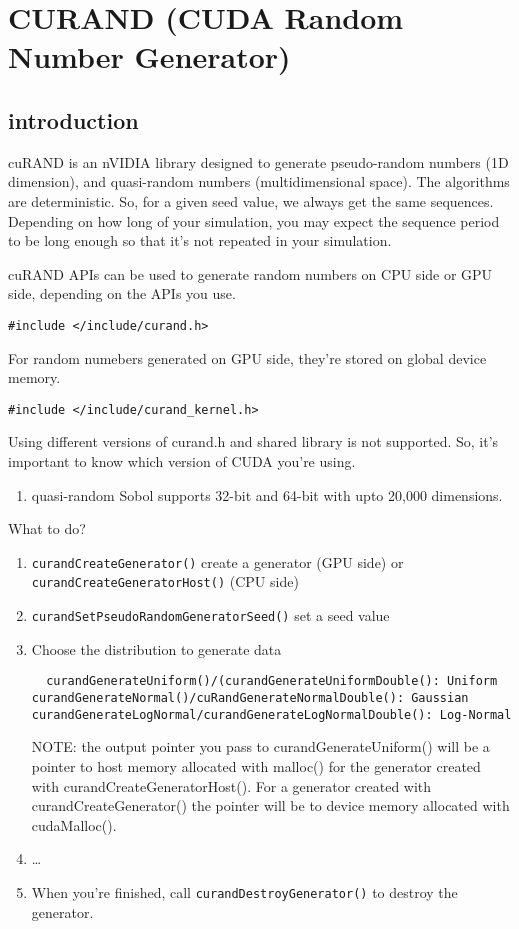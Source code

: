 \chapter{CURAND (CUDA Random Number Generator)}
\label{chap:cuRAND}

\section{introduction}

cuRAND is an nVIDIA library designed to generate pseudo-random numbers (1D
dimension), and quasi-random numbers (multidimensional space). The algorithms
are deterministic. So, for a given seed value, we always get the same sequences.
Depending on how long of your simulation, you may expect the sequence period to
be long enough so that it's not repeated in your simulation. 

cuRAND APIs can be used to generate random numbers on CPU side or GPU side,
depending on the APIs you use. 
\begin{verbatim}
#include </include/curand.h>
\end{verbatim}
For random numebers generated on GPU side, they're stored on global device
memory. 
\begin{verbatim}
#include </include/curand_kernel.h>
\end{verbatim}

Using different versions of curand.h and shared library is not supported. So,
it's important to know which version of CUDA you're using. 
\begin{enumerate}
  \item quasi-random Sobol supports 32-bit and 64-bit with upto 20,000
  dimensions.
\end{enumerate}

What to do?
\begin{enumerate}
  \item \verb!curandCreateGenerator()! create a generator (GPU side) or
  \verb!curandCreateGeneratorHost()! (CPU side)
  \item \verb!curandSetPseudoRandomGeneratorSeed()! set a seed value
  \item Choose the distribution to generate data
  \begin{verbatim}
  curandGenerateUniform()/(curandGenerateUniformDouble(): Uniform
curandGenerateNormal()/cuRandGenerateNormalDouble(): Gaussian
curandGenerateLogNormal/curandGenerateLogNormalDouble(): Log-Normal
  \end{verbatim}
  
  NOTE: the output pointer you pass to curandGenerateUniform() will be a pointer
  to host memory allocated with malloc() for the generator created with
  curandCreateGeneratorHost(). For a generator created with
  curandCreateGenerator() the pointer will be to device memory allocated with cudaMalloc().  
  
  \item \ldots 
  \item When you're finished, call \verb!curandDestroyGenerator()! to destroy
  the generator. 
\end{enumerate}

